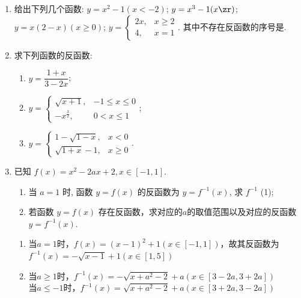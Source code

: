 \begin{enumerate}
\item 给出下列几个函数:
 $y=x^2-1(x<-2)$; 
 $y=x^3-1(x\zr)$; 
 $y=x(2-x)(x\geq 0)$; 
 $y=\begin{cases}
2x, & x\geq 2\\
4, & x=1
\end{cases}$. 
其中不存在反函数的序号是. 


\item 求下列函数的反函数: \\
\begin{jieda}
\begin{enumerate}[(1)]
\item $y=\dfrac{1+x}{3-2x}$; 
\item $y=\begin{cases}
\sqrt{x+1}, & -1\leq x\leq 0\\
-x^{\frac{3}{2}}, & 0<x\leq 1
\end{cases}$; 
\item $y=\begin{cases}
1-\sqrt{1-x}, & x<0\\
\sqrt{1+x}-1, & x\geq 0
\end{cases}$. 
\end{enumerate}
\end{jieda}
\begin{vspace_}
    \vsp[3]
\end{vspace_}


\item 已知 $f(x)=x^2-2 a x+2, x \in[-1,1]$.
\begin{enumerate}
\item 当 $a=1$ 时, 函数 $y=f(x)$ 的反函数为 $y=f^{-1}(x)$, 求 $f^{-1}$ (1);
\item 若函数 $y=f(x)$ 存在反函数，求对应的$a$的取值范围以及对应的反函数 $y=f^{-1}(x)$.
\end{enumerate}
\begin{jieda}
    \begin{enumerate}
        \item 当$a = 1$时，$f(x) = (x-1)^2+1 (x \in [-1, 1])$，故其反函数为$f^{-1}(x) = -\sqrt{x-1}+1 (x \in [1, 5])$
        \item 当$a \geq 1$时，$f^{-1}(x) = -\sqrt{x+a^2-2}+a (x \in [3-2a, 3+2a])$ \\
        当$a \leq -1$时，$f^{-1}(x) = \sqrt{x+a^2-2}+a (x \in [3+2a, 3-2a])$
    \end{enumerate}
\end{jieda}
\begin{vspace_}
    \vsp[3]
\end{vspace_}



\end{enumerate}
